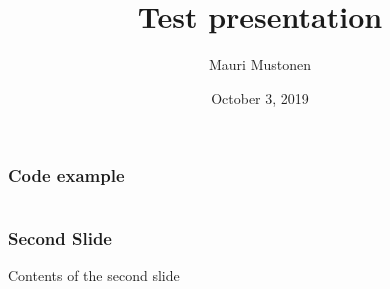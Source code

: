 \documentclass{beamer}
\title{Test presentation}
\author{Mauri Mustonen}
\date{October 3, 2019}
\begin{document}
\maketitle

\begin{frame}[fragile]
\frametitle{Code example}
\inputminted{js}{example.js}
\end{frame}

\begin{frame}
\frametitle{Second Slide}
Contents of the second slide
\end{frame}
\end{document}
